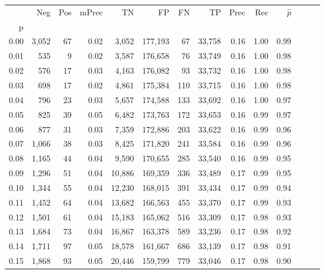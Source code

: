 \begin{tabular}{rrrrrrrrrrrrrr}
\toprule
{} &    Neg &  Pos & mPrec &       TN &       FP &      FN &      TP &  Prec &   Rec & $\hat{p}$ \\
p    &        &      &       &          &          &         &         &       &       &           \\
\midrule
0.00 &  3,052 &   67 &  0.02 &    3,052 &  177,193 &      67 &  33,758 &  0.16 &  1.00 &      0.99 \\
0.01 &    535 &    9 &  0.02 &    3,587 &  176,658 &      76 &  33,749 &  0.16 &  1.00 &      0.98 \\
0.02 &    576 &   17 &  0.03 &    4,163 &  176,082 &      93 &  33,732 &  0.16 &  1.00 &      0.98 \\
0.03 &    698 &   17 &  0.02 &    4,861 &  175,384 &     110 &  33,715 &  0.16 &  1.00 &      0.98 \\
0.04 &    796 &   23 &  0.03 &    5,657 &  174,588 &     133 &  33,692 &  0.16 &  1.00 &      0.97 \\
0.05 &    825 &   39 &  0.05 &    6,482 &  173,763 &     172 &  33,653 &  0.16 &  0.99 &      0.97 \\
0.06 &    877 &   31 &  0.03 &    7,359 &  172,886 &     203 &  33,622 &  0.16 &  0.99 &      0.96 \\
0.07 &  1,066 &   38 &  0.03 &    8,425 &  171,820 &     241 &  33,584 &  0.16 &  0.99 &      0.96 \\
0.08 &  1,165 &   44 &  0.04 &    9,590 &  170,655 &     285 &  33,540 &  0.16 &  0.99 &      0.95 \\
0.09 &  1,296 &   51 &  0.04 &   10,886 &  169,359 &     336 &  33,489 &  0.17 &  0.99 &      0.95 \\
0.10 &  1,344 &   55 &  0.04 &   12,230 &  168,015 &     391 &  33,434 &  0.17 &  0.99 &      0.94 \\
0.11 &  1,452 &   64 &  0.04 &   13,682 &  166,563 &     455 &  33,370 &  0.17 &  0.99 &      0.93 \\
0.12 &  1,501 &   61 &  0.04 &   15,183 &  165,062 &     516 &  33,309 &  0.17 &  0.98 &      0.93 \\
0.13 &  1,684 &   73 &  0.04 &   16,867 &  163,378 &     589 &  33,236 &  0.17 &  0.98 &      0.92 \\
0.14 &  1,711 &   97 &  0.05 &   18,578 &  161,667 &     686 &  33,139 &  0.17 &  0.98 &      0.91 \\
0.15 &  1,868 &   93 &  0.05 &   20,446 &  159,799 &     779 &  33,046 &  0.17 &  0.98 &      0.90 \\

\end{tabular}
